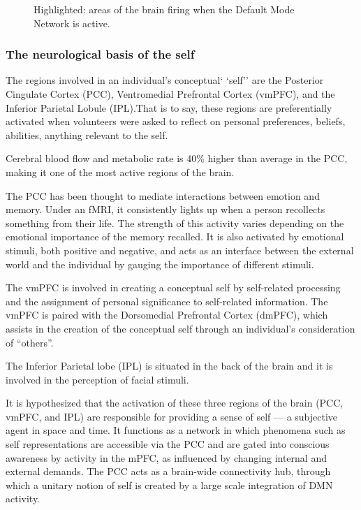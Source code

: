 \documentclass[a4paper, amsfonts, amssymb, amsmath, reprint, showkeys, nofootinbib, twoside]{revtex4-1}
\begin{document}
\begin{figure}[h!]
\begin{subfigure}[b]{0.48\linewidth}
  \end{subfigure}
  \caption{Highlighted: areas of the brain firing when the Default Mode Network is active.}
  \label{fig:dmn}
\end{figure}

\subsubsection{The neurological basis of the self}

The regions involved in an individual's conceptual` `self'' are the Posterior
Cingulate Cortex (PCC), Ventromedial Prefrontal Cortex (vmPFC), and the Inferior
Parietal Lobule (IPL).That is to say, these regions are preferentially activated when 
volunteers were asked to reflect on personal preferences, beliefs, abilities, 
anything relevant to the self. \cite{defaultnetworkadaptive} 

Cerebral blood flow and metabolic rate is 40\% higher than average in the PCC,
making it one of the most active regions of the brain. \cite{pccrole}

The PCC has been thought to mediate interactions between emotion and memory. 
Under an fMRI, it consistently lights up when a person recollects something from their
life. The strength of this activity varies depending on the emotional importance of 
the memory recalled. It is also activated by emotional stimuli, 
both positive and negative, and acts as an interface between the external world 
and the individual by gauging the importance of different stimuli. \cite{pccemotion}

The vmPFC is involved in creating a conceptual self by self-related processing
and the assignment of personal significance to self-related
information. \cite{dmnself} The vmPFC is paired with the Dorsomedial Prefrontal
Cortex (dmPFC), which assists in the creation of the conceptual self through an
individual's consideration of ``others''.

The Inferior Parietal lobe (IPL) is situated in the back of the brain and it is 
involved in the perception of facial stimuli. \cite{ipl}

It is hypothesized that the activation of these three regions of the brain (PCC,
vmPFC, and IPL) are responsible for providing a sense of self --- a subjective agent
in space and time. It functions as a network in which phenomena such as self
representations are accessible via the PCC \cite{mappingself} and are gated into 
conscious awareness by activity in the mPFC, as influenced by changing internal 
and external demands. The PCC acts as a brain-wide connectivity hub, through which a unitary notion of self is
created by a large scale integration of DMN activity. \cite{mappingself}
\end{document}
